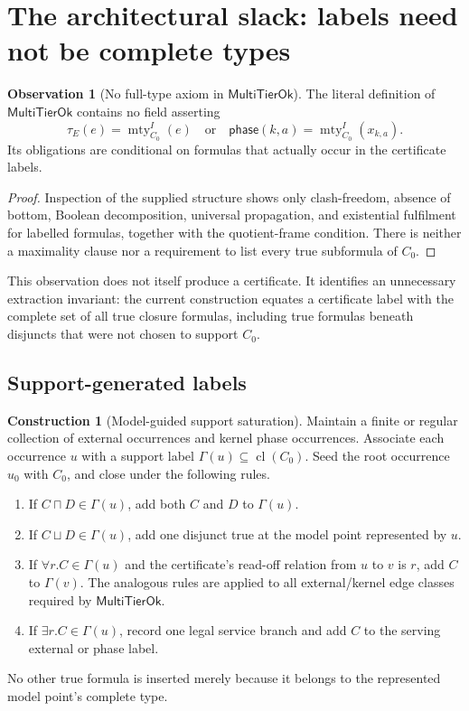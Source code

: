 \documentclass[11pt,letterpaper]{article}
\newcommand{\mty}{\operatorname{mty}}
\newcommand{\cl}{\operatorname{cl}}
\newcommand{\MultiTierOk}{\ensuremath{\mathsf{MultiTierOk}}}
\theoremstyle{definition}
\newtheorem{construction}[definition]{Construction}
\newtheorem{observation}[definition]{Observation}
\theoremstyle{plain}
\theoremstyle{remark}
\begin{document}
\section{The architectural slack: labels need not be complete types}

\begin{observation}[No full-type axiom in \MultiTierOk]\label{obs:no-full-type}
The literal definition of \MultiTierOk{} contains no field asserting
\[
   \tau_E(e)=\mty_{C_0}^{I}(e)
   \quad\text{or}\quad
   \mathsf{phase}(k,a)=\mty_{C_0}^{I}(x_{k,a}).
\]
Its obligations are conditional on formulas that actually occur in the
certificate labels.
\end{observation}

\begin{proof}
Inspection of the supplied structure shows only clash-freedom, absence of
bottom, Boolean decomposition, universal propagation, and existential
fulfilment for labelled formulas, together with the quotient-frame condition.
There is neither a maximality clause nor a requirement to list every true
subformula of $C_0$.
\end{proof}

This observation does not itself produce a certificate.  It identifies an
unnecessary extraction invariant: the current construction equates a
certificate label with the complete set of all true closure formulas, including
true formulas beneath disjuncts that were not chosen to support $C_0$.

\subsection{Support-generated labels}

\begin{construction}[Model-guided support saturation]\label{con:support}
Maintain a finite or regular collection of external occurrences and kernel
phase occurrences.  Associate each occurrence $u$ with a support label
$\Gamma(u)\subseteq\cl(C_0)$.  Seed the root occurrence $u_0$ with $C_0$, and
close under the following rules.

\begin{enumerate}
  \item If $C\sqcap D\in\Gamma(u)$, add both $C$ and $D$ to $\Gamma(u)$.
  \item If $C\sqcup D\in\Gamma(u)$, add one disjunct true at the model point
        represented by $u$.
  \item If $\forall r.C\in\Gamma(u)$ and the certificate's read-off relation
        from $u$ to $v$ is $r$, add $C$ to $\Gamma(v)$.  The analogous rules
        are applied to all external/kernel edge classes required by
        \MultiTierOk{}.
  \item If $\exists r.C\in\Gamma(u)$, record one legal service branch and add
        $C$ to the serving external or phase label.
\end{enumerate}
No other true formula is inserted merely because it belongs to the represented
model point's complete type.
\end{construction}
\end{document}

